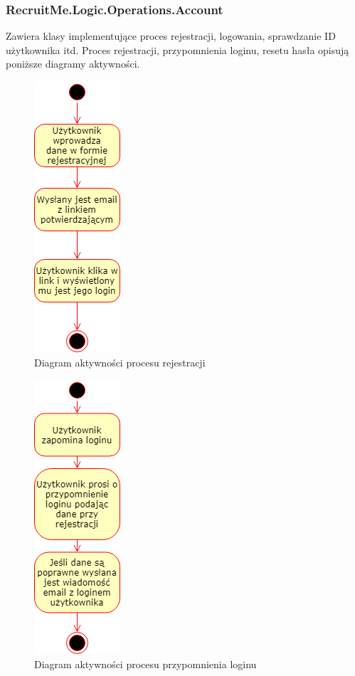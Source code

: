 \documentclass{article}
\begin{document}
\subsubsection{RecruitMe.Logic.Operations.Account}
Zawiera klasy implementujące proces rejestracji, logowania, sprawdzanie ID użytkownika itd. Proces rejestracji, przypomnienia loginu, resetu hasła opisują poniższe diagramy aktywności.
\begin{figure}[H]
\centering
\includegraphics[scale=0.5]{images/Rejestracja.png}
\caption{Diagram aktywności procesu rejestracji}
\end{figure}

\begin{figure}[H]
\centering
\includegraphics[scale=0.5]{images/przypomnienieloginu.png}
\caption{Diagram aktywności procesu przypomnienia loginu}
\end{figure}
\end{document}
